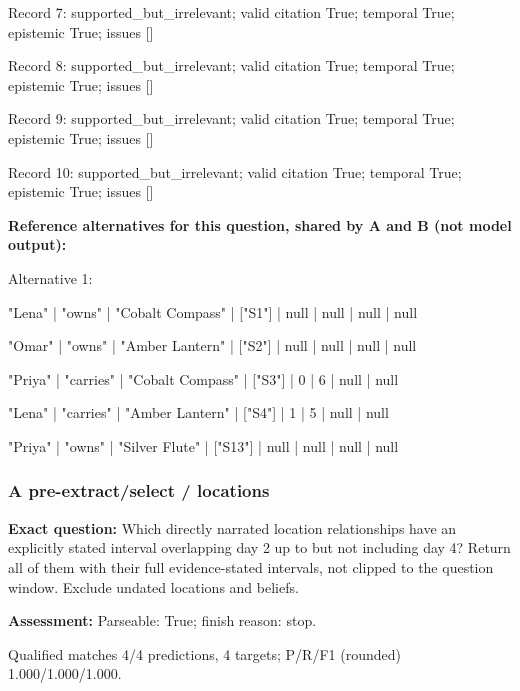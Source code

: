 Record 7: supported\_but\_irrelevant; valid citation True; temporal True; epistemic True; issues []\par

Record 8: supported\_but\_irrelevant; valid citation True; temporal True; epistemic True; issues []\par

Record 9: supported\_but\_irrelevant; valid citation True; temporal True; epistemic True; issues []\par

Record 10: supported\_but\_irrelevant; valid citation True; temporal True; epistemic True; issues []\par

\noindent\textbf{Reference alternatives for this question, shared by A and B (not model output):}

\noindent Alternative 1:

"Lena" | "owns" | "Cobalt Compass" | ["S1"] | null | null | null | null\par\smallskip

"Omar" | "owns" | "Amber Lantern" | ["S2"] | null | null | null | null\par\smallskip

"Priya" | "carries" | "Cobalt Compass" | ["S3"] | 0 | 6 | null | null\par\smallskip

"Lena" | "carries" | "Amber Lantern" | ["S4"] | 1 | 5 | null | null\par\smallskip

"Priya" | "owns" | "Silver Flute" | ["S13"] | null | null | null | null\par\smallskip

\subsubsection*{A pre-extract/select / locations}

\noindent\textbf{Exact question:} Which directly narrated location relationships have an explicitly stated interval overlapping day 2 up to but not including day 4? Return all of them with their full evidence-stated intervals, not clipped to the question window. Exclude undated locations and beliefs.\par

\noindent\textbf{Assessment:} Parseable: True; finish reason: stop.

Qualified matches 4/4 predictions, 4 targets; P/R/F1 (rounded) 1.000/1.000/1.000.\par

